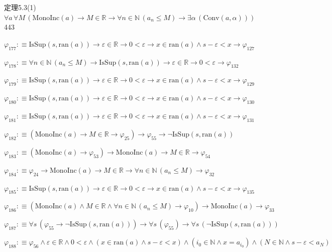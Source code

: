 \begin{fullproof}{定理5.3(1)}{$\forall a\,\forall M\,(\mathrm{MonoInc}(a) \to M \in \mathbb{R} \to \forall n \in \mathbb{N}\,(a_{n} \leq M) \to \exists \alpha\,(\mathrm{Conv}(a,\alpha)))$}{443}
\begin{abbrevlist}
\item $\varphi_{177} :\equiv \mathrm{IsSup}(s,\mathrm{ran}(a)) \to \varepsilon \in \mathbb{R} \to 0 < \varepsilon \to x \in \mathrm{ran}(a) \land s - \varepsilon < x \to \varphi_{127}$
\item $\varphi_{178} :\equiv \forall n \in \mathbb{N}\,(a_{n} \leq M) \to \mathrm{IsSup}(s,\mathrm{ran}(a)) \to \varepsilon \in \mathbb{R} \to 0 < \varepsilon \to \varphi_{132}$
\item $\varphi_{179} :\equiv \mathrm{IsSup}(s,\mathrm{ran}(a)) \to \varepsilon \in \mathbb{R} \to 0 < \varepsilon \to x \in \mathrm{ran}(a) \land s - \varepsilon < x \to \varphi_{129}$
\item $\varphi_{180} :\equiv \mathrm{IsSup}(s,\mathrm{ran}(a)) \to \varepsilon \in \mathbb{R} \to 0 < \varepsilon \to x \in \mathrm{ran}(a) \land s - \varepsilon < x \to \varphi_{130}$
\item $\varphi_{181} :\equiv \mathrm{IsSup}(s,\mathrm{ran}(a)) \to \varepsilon \in \mathbb{R} \to 0 < \varepsilon \to x \in \mathrm{ran}(a) \land s - \varepsilon < x \to \varphi_{131}$
\item $\varphi_{182} :\equiv (\mathrm{MonoInc}(a) \to M \in \mathbb{R} \to \varphi_{25}) \to \varphi_{55} \to \neg \mathrm{IsSup}(s,\mathrm{ran}(a))$
\item $\varphi_{183} :\equiv (\mathrm{MonoInc}(a) \to \varphi_{53}) \to \mathrm{MonoInc}(a) \to M \in \mathbb{R} \to \varphi_{54}$
\item $\varphi_{184} :\equiv \varphi_{24} \to \mathrm{MonoInc}(a) \to M \in \mathbb{R} \to \forall n \in \mathbb{N}\,(a_{n} \leq M) \to \varphi_{32}$
\item $\varphi_{185} :\equiv \mathrm{IsSup}(s,\mathrm{ran}(a)) \to \varepsilon \in \mathbb{R} \to 0 < \varepsilon \to x \in \mathrm{ran}(a) \land s - \varepsilon < x \to \varphi_{135}$
\item $\varphi_{186} :\equiv (\mathrm{MonoInc}(a) \land M \in \mathbb{R} \land \forall n \in \mathbb{N}\,(a_{n} \leq M) \to \varphi_{10}) \to \mathrm{MonoInc}(a) \to \varphi_{33}$
\item $\varphi_{187} :\equiv \forall s\,(\varphi_{55} \to \neg \mathrm{IsSup}(s,\mathrm{ran}(a))) \to \forall s\,(\varphi_{55}) \to \forall s\,(\neg \mathrm{IsSup}(s,\mathrm{ran}(a)))$
\item $\varphi_{188} :\equiv \varphi_{56} \land \varepsilon \in \mathbb{R} \land 0 < \varepsilon \land (x \in \mathrm{ran}(a) \land s - \varepsilon < x) \land (i_{0} \in \mathbb{N} \land x = a_{i_{0}}) \land (N \in \mathbb{N} \land s - \varepsilon < a_{N})$

\end{abbrevlist}
\end{fullproof}
